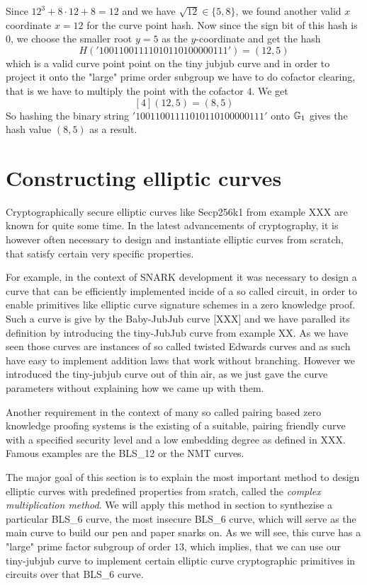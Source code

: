 \begin{example}
Since $12^3 + 8\cdot 12 + 8 = 12$ and we have $\sqrt{12}\in\{5, 8\}$, we found another valid $x$ coordinate $x=12$ for the curve point hash. Now since the sign bit of this hash is $0$, we choose the smaller root $y=5$ as the $y$-coordinate and get the hash
$$
H('10011001111010110100000111') = (12,5)
$$
which is a valid curve point point on the tiny jubjub curve and in order to project it onto the "large" prime order subgroup we have to do cofactor clearing, that is we have to multiply the point with the cofactor $4$. We get
$$
[4](12,5) = (8,5)
$$
So hashing the binary string $'10011001111010110100000111'$ onto $\mathbb{G}_1$ gives the hash value $(8,5)$ as a result.
\end{example}

\section{Constructing elliptic curves} Cryptographically secure elliptic curves like Secp256k1 from example XXX are known for quite some time. In the latest advancements of cryptography, it is however often necessary to design and instantiate elliptic curves from scratch, that satisfy certain very specific properties.

For example, in the context of SNARK development it was necessary to design a curve that can be efficiently implemented incide of a so called circuit, in order to enable primitives like elliptic curve signature schemes in a zero knowledge proof. Such a curve is give by the Baby-JubJub curve [XXX] and we have paralled its definition by introducing the tiny-JubJub curve from example XX. As we have seen those curves are instances of so called twisted Edwards curves and as such have easy to implement addition laws that work without branching. However we introduced the tiny-jubjub curve out of thin air, as we just gave the curve parameters without explaining how we came up with them.

Another requirement in the context of many so called pairing based zero knowledge proofing systems is the existing of a suitable, pairing friendly curve with a specified security level and a low embedding degree as defined in XXX. Famous examples are the BLS\_12 or the NMT curves.

The major goal of this section is to explain the most important method to design elliptic curves with predefined properties from sratch, called the \textit{complex multiplication method}. We will apply this method in section to synthezise a particular BLS\_6 curve, the most insecure BLS\_6 curve, which will serve as the main curve to build our pen and paper snarks on. As we will see, this curve has a "large" prime factor subgroup of order $13$, which implies, that we can use our tiny-jubjub curve to implement certain elliptic curve cryptographic primitives in circuits over that BLS\_6 curve.

